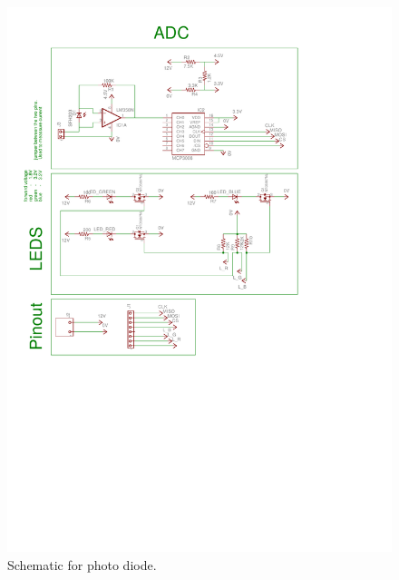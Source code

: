 \begin{figure}[h]
\centering%
 \includegraphics[scale=0.9,trim={2.4cm 20.8cm 5.1cm 2.2cm},clip]{img/adc_schematic.pdf}
  \caption{Schematic for photo diode.}
  \label{fig:sch_photo_diode}
\end{figure}

